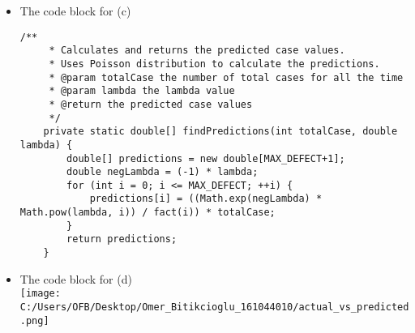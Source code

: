 \documentclass[a4 paper]{article}
\numberwithin{equation}{section}
\newcommand{\0}{\mathbf{0}}
\begin{document}
\begin{itemize}
\begin{lstlisting}
            String line = br.readLine();
            while (line != null) {
                String[] row = line.split("\t");
                double total = 0.0;
                for (int i = 2; i < row.length; ++i) {
                    total += Integer.parseInt(row[i]);
                }
                lambda += total / NUM_OF_COMPANIES; // Calculate the mean for each year
                line = br.readLine();
            }
            br.close();
        } catch (IOException e) {
            e.printStackTrace();
        }
        lambda /= TIME; // Calculate the mean for all years
        return lambda;
    }
		\end{lstlisting}
		\item The code block for (c)\\
		\begin{lstlisting}
/**
     * Calculates and returns the predicted case values.
     * Uses Poisson distribution to calculate the predictions.
     * @param totalCase the number of total cases for all the time
     * @param lambda the lambda value
     * @return the predicted case values
     */
    private static double[] findPredictions(int totalCase, double lambda) {
        double[] predictions = new double[MAX_DEFECT+1];
        double negLambda = (-1) * lambda;
        for (int i = 0; i <= MAX_DEFECT; ++i) {
            predictions[i] = ((Math.exp(negLambda) * Math.pow(lambda, i)) / fact(i)) * totalCase;
        }
        return predictions;
    }
		\end{lstlisting}
		\item The code block for (d)\\
\texttt{[image: C:/Users/OFB/Desktop/Omer\_Bitikcioglu\_161044010/actual\_vs\_predicted.png]}


	\end{itemize}
	
	
	
	
\end{document}
